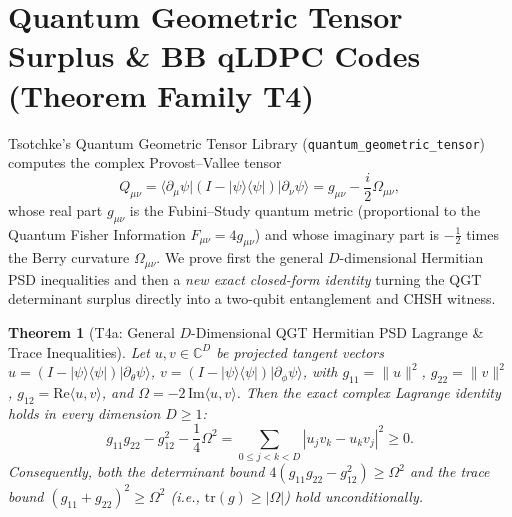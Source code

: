 \documentclass[11pt,reqno]{amsart}
\newtheorem{theorem}{Theorem}[section]
\theoremstyle{definition}
\newcommand{\C}{\mathbb{C}}
\newcommand{\code}[1]{\texttt{\small #1}}
\begin{document}
\section{Quantum Geometric Tensor Surplus \& BB qLDPC Codes (Theorem Family T4)}
\label{sec:qgtl}

Tsotchke's Quantum Geometric Tensor Library (\code{quantum\_geometric\_tensor})~\cite{tsotchke_qgtl} computes the complex Provost--Vallee tensor~\cite{provost1980}
\[
  Q_{\mu\nu} = \langle \partial_\mu \psi | (I - |\psi\rangle\langle\psi|) | \partial_\nu \psi \rangle = g_{\mu\nu} - \frac{i}{2}\Omega_{\mu\nu},
\]
whose real part $g_{\mu\nu}$ is the Fubini--Study quantum metric (proportional to the Quantum Fisher Information $F_{\mu\nu} = 4 g_{\mu\nu}$) and whose imaginary part is $-\frac{1}{2}$ times the Berry curvature $\Omega_{\mu\nu}$.
We prove first the general $D$-dimensional Hermitian PSD inequalities and then a \emph{new exact closed-form identity} turning the QGT determinant surplus directly into a two-qubit entanglement and CHSH witness.

\begin{theorem}[T4a: General $D$-Dimensional QGT Hermitian PSD Lagrange \& Trace Inequalities]
\label{thm:t4a}
Let $u, v \in \C^D$ be projected tangent vectors $u = (I - |\psi\rangle\langle\psi|)|\partial_\theta\psi\rangle$, $v = (I - |\psi\rangle\langle\psi|)|\partial_\phi\psi\rangle$, with $g_{11} = \|u\|^2$, $g_{22} = \|v\|^2$, $g_{12} = \mathrm{Re}\langle u, v\rangle$, and $\Omega = -2\,\mathrm{Im}\langle u, v\rangle$. Then the exact complex Lagrange identity holds in every dimension $D \ge 1$:
\[
  g_{11} g_{22} - g_{12}^2 - \frac{1}{4}\Omega^2 = \sum_{0 \le j < k < D} |u_j v_k - u_k v_j|^2 \ge 0.
\]
Consequently, both the determinant bound $4(g_{11} g_{22} - g_{12}^2) \ge \Omega^2$ and the trace bound $(g_{11} + g_{22})^2 \ge \Omega^2$ (i.e., $\mathrm{tr}(g) \ge |\Omega|$) hold unconditionally.
\end{theorem}
\end{document}
